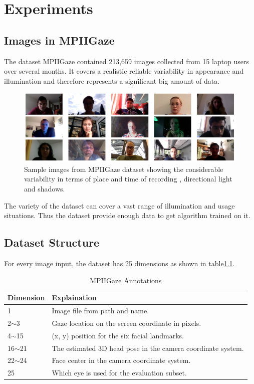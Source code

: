 \documentclass[senior]{IPSstyle}
\begin{document}
\chapter{Experiments} \label{experiments}
\section{Images in MPIIGaze}\label{sec: dataset}
The dataset MPIIGaze contained 213,659 images collected from 15 laptop users over several months.
It covers a realistic reliable variability in appearance and illumination and therefore represents a significant big amount of data.
\begin{figure}
    \centering
    \includegraphics[width=15cm]{MasterThesis-master/images/head_images.jpg}
    \caption{Sample images from MPIIGaze dataset showing the considerable variability in terms of place and time of recording , directional light and shadows.}
    \label{fig:head images}
\end{figure}
The variety of the dataset can cover a vast range of illumination and usage situations.
Thus the dataset provide enough data to get algorithm trained on it.

\section{Dataset Structure}
For every image input, the dataset has 25 dimensions as shown in table\ref{table: annotations}.

\begin{table}[h]
\centering
\begin{tabular}{|l|l|}
\hline
Dimension  & Explaination                                                     \\ \hline
1          & Image file from path and name.                               \\ \hline
2$\sim$3   & Gaze location on the screen coordinate in pixels.           \\ \hline
4$\sim$15  & (x, y) position for the six facial landmarks.                \\ \hline
16$\sim$21 & The estimated 3D head pose in the camera coordinate system. \\ \hline
22$\sim$24 & Face center in the camera coordinate system.                  \\ \hline
25         & Which eye is used for the evaluation subset.                \\ \hline
\end{tabular}
\caption{MPIIGaze Annotations}
\label{table: annotations}
\end{table}
\end{document}
